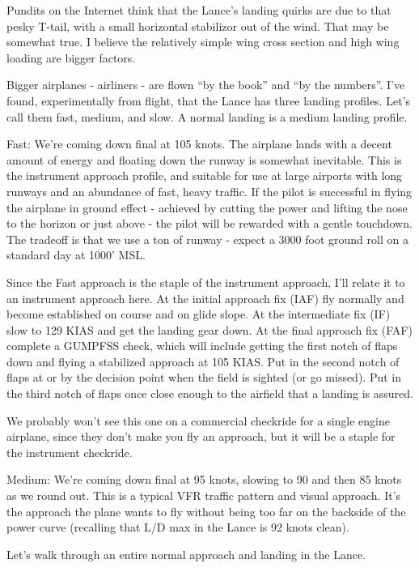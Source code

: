 Pundits on the Internet think that the Lance's landing quirks are due to that pesky T-tail, with a small horizontal stabilizor out of the wind. That may be somewhat true. I believe the relatively simple wing cross section and high wing loading are bigger factors.

Bigger airplanes - airliners - are flown ``by the book'' and ``by the numbers''. I've found, experimentally from flight, that the Lance has three landing profiles. Let's call them fast, medium, and slow. A normal landing is a medium landing profile.

Fast: We're coming down final at 105 knots. The airplane lands with a decent amount of energy and floating down the runway is somewhat inevitable. This is the instrument approach profile, and suitable for use at large airports with long runways and an abundance of fast, heavy traffic. If the pilot is successful in flying the airplane in ground effect - achieved by cutting the power and lifting the nose to the horizon or just above - the pilot will be rewarded with a gentle touchdown. The tradeoff is that we use a ton of runway - expect a 3000 foot ground roll on a standard day at 1000' MSL.

Since the Fast approach is the staple of the instrument approach, I'll relate it to an instrument approach here. At the initial approach fix (IAF) fly normally and become established on course and on glide slope. At the intermediate fix (IF) slow to 129 KIAS and get the landing gear down. At the final approach fix (FAF) complete a GUMPFSS check, which will include getting the first notch of flaps down and flying a stabilized approach at 105 KIAS. Put in the second notch of flaps at or by the decision point when the field is sighted (or go missed). Put in the third notch of flaps once close enough to the airfield that a landing is assured.

We probably won't see this one on a commercial checkride for a single engine airplane, since they don't make you fly an approach, but it will be a staple for the instrument checkride.

Medium: We're coming down final at 95 knots, slowing to 90 and then 85 knots as we round out. This is a typical VFR traffic pattern and visual approach. It's the approach the plane wants to fly without being too far on the backside of the power curve (recalling that L/D max in the Lance is 92 knots clean).

Let's walk through an entire normal approach and landing in the Lance.

